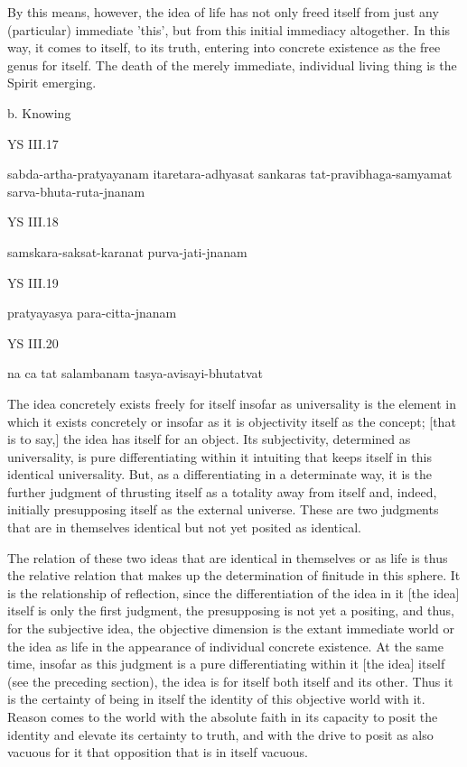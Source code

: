 By this means, however, the idea of life
has not only freed itself from just
any (particular) immediate 'this',
but from this initial immediacy altogether.
In this way, it comes to itself, to its truth,
entering into concrete existence
as the free genus for itself.
The death of the merely immediate,
individual living thing is the Spirit emerging.

b. Knowing

YS III.17

sabda-artha-pratyayanam itaretara-adhyasat sankaras
tat-pravibhaga-samyamat sarva-bhuta-ruta-jnanam

YS III.18

samskara-saksat-karanat purva-jati-jnanam

YS III.19

pratyayasya para-citta-jnanam

YS III.20

na ca tat salambanam tasya-avisayi-bhutatvat

The idea concretely exists freely for itself insofar as universality is the element
in which it exists concretely or insofar as it is objectivity itself as the concept;
[that is to say,] the idea has itself for an object.
Its subjectivity, determined as universality, is pure differentiating within it
intuiting that keeps itself in this identical universality.
But, as a differentiating in a determinate way, it is the further judgment of
thrusting itself as a totality away from itself and, indeed,
initially presupposing itself as the external universe.
These are two judgments that are in themselves identical but
not yet posited as identical.

The relation of these two ideas that are identical in themselves or as life is thus
the relative relation that makes up the determination of finitude in this sphere.
It is the relationship of reflection, since the differentiation of
the idea in it [the idea] itself is only the first judgment,
the presupposing is not yet a positing, and thus,
for the subjective idea, the objective dimension is the extant immediate world or
the idea as life in the appearance of individual concrete existence.
At the same time, insofar as this judgment is a pure differentiating
within it [the idea] itself (see the preceding section),
the idea is for itself both itself and its other.
Thus it is the certainty of being in itself
the identity of this objective world with it.
Reason comes to the world with the absolute faith
in its capacity to posit the identity and
elevate its certainty to truth, and
with the drive to posit as also vacuous for it
that opposition that is in itself vacuous.

